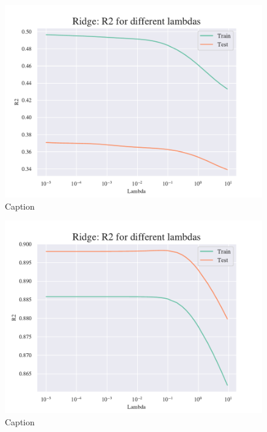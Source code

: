 \begin{figure}
    \centering
    \includegraphics[width=1\linewidth]{project_1/figures/figures_in_appendix/Ridge_R2_Franke_Noise.pdf}
    \caption{Caption}
    \label{fig:ref}
\end{figure}

\begin{figure}
    \centering
    \includegraphics[width=1\linewidth]{project_1/figures/figures_in_appendix/Ridge_R2_terrain.pdf}
    \caption{Caption}
    \label{fig:ref}
\end{figure}